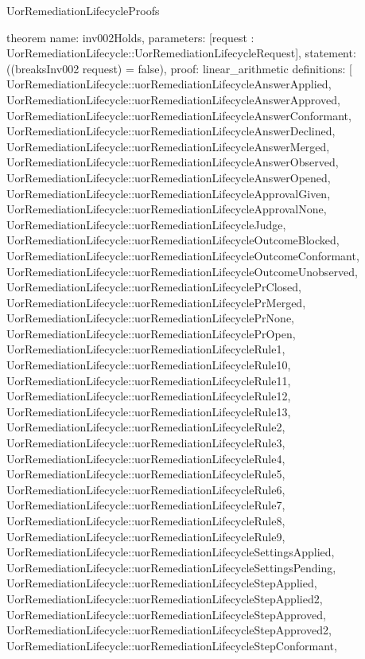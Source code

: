 \begin{lexlean}{UorRemediationLifecycleProofs}
\begin{semanticmodule}
theorem{
  name: inv002Holds,
  parameters: [request : UorRemediationLifecycle::UorRemediationLifecycleRequest],
  statement: ((breaksInv002 request) = false),
  proof: linear_arithmetic{
    definitions: [
      UorRemediationLifecycle::uorRemediationLifecycleAnswerApplied,
      UorRemediationLifecycle::uorRemediationLifecycleAnswerApproved,
      UorRemediationLifecycle::uorRemediationLifecycleAnswerConformant,
      UorRemediationLifecycle::uorRemediationLifecycleAnswerDeclined,
      UorRemediationLifecycle::uorRemediationLifecycleAnswerMerged,
      UorRemediationLifecycle::uorRemediationLifecycleAnswerObserved,
      UorRemediationLifecycle::uorRemediationLifecycleAnswerOpened,
      UorRemediationLifecycle::uorRemediationLifecycleApprovalGiven,
      UorRemediationLifecycle::uorRemediationLifecycleApprovalNone,
      UorRemediationLifecycle::uorRemediationLifecycleJudge,
      UorRemediationLifecycle::uorRemediationLifecycleOutcomeBlocked,
      UorRemediationLifecycle::uorRemediationLifecycleOutcomeConformant,
      UorRemediationLifecycle::uorRemediationLifecycleOutcomeUnobserved,
      UorRemediationLifecycle::uorRemediationLifecyclePrClosed,
      UorRemediationLifecycle::uorRemediationLifecyclePrMerged,
      UorRemediationLifecycle::uorRemediationLifecyclePrNone,
      UorRemediationLifecycle::uorRemediationLifecyclePrOpen,
      UorRemediationLifecycle::uorRemediationLifecycleRule1,
      UorRemediationLifecycle::uorRemediationLifecycleRule10,
      UorRemediationLifecycle::uorRemediationLifecycleRule11,
      UorRemediationLifecycle::uorRemediationLifecycleRule12,
      UorRemediationLifecycle::uorRemediationLifecycleRule13,
      UorRemediationLifecycle::uorRemediationLifecycleRule2,
      UorRemediationLifecycle::uorRemediationLifecycleRule3,
      UorRemediationLifecycle::uorRemediationLifecycleRule4,
      UorRemediationLifecycle::uorRemediationLifecycleRule5,
      UorRemediationLifecycle::uorRemediationLifecycleRule6,
      UorRemediationLifecycle::uorRemediationLifecycleRule7,
      UorRemediationLifecycle::uorRemediationLifecycleRule8,
      UorRemediationLifecycle::uorRemediationLifecycleRule9,
      UorRemediationLifecycle::uorRemediationLifecycleSettingsApplied,
      UorRemediationLifecycle::uorRemediationLifecycleSettingsPending,
      UorRemediationLifecycle::uorRemediationLifecycleStepApplied,
      UorRemediationLifecycle::uorRemediationLifecycleStepApplied2,
      UorRemediationLifecycle::uorRemediationLifecycleStepApproved,
      UorRemediationLifecycle::uorRemediationLifecycleStepApproved2,
      UorRemediationLifecycle::uorRemediationLifecycleStepConformant,
}}
\end{semanticmodule}
\end{lexlean}
